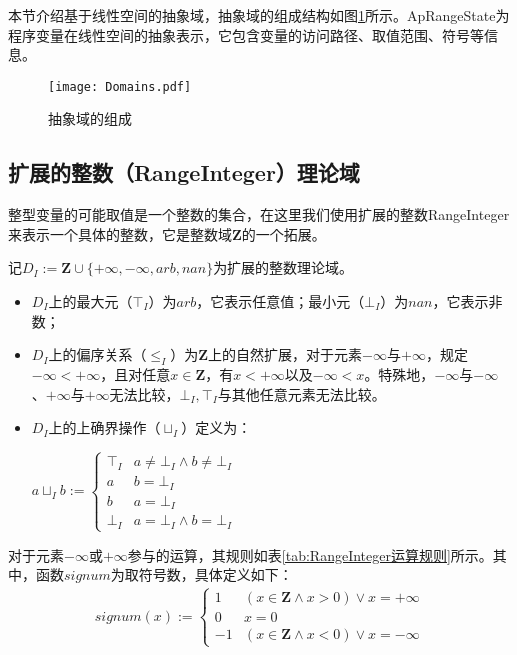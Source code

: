 本节介绍基于线性空间的抽象域，抽象域的组成结构如图\ref{fig:Domains}所示。ApRangeState为程序变量在线性空间的抽象表示，它包含变量的访问路径、取值范围、符号等信息。

\begin{figure}[H]
	\centering
	\texttt{[image: Domains.pdf]}
	\caption{抽象域的组成}
	\label{fig:Domains}
\end{figure}

\subsection{扩展的整数（RangeInteger）理论域}

整型变量的可能取值是一个整数的集合，在这里我们使用扩展的整数RangeInteger来表示一个具体的整数，它是整数域$ \mathbf{Z} $的一个拓展。

\begin{definition}
	记$ D_I := \mathbf{Z} \cup \{ +\infty, -\infty, arb, nan\}  $为扩展的整数理论域。
	\begin{itemize}
		\item $ D_I $上的最大元（$ \top_I $）为$ arb $，它表示任意值；最小元（$ \bot_I $）为$ nan $，它表示非数；
		
		\item $ D_I $上的偏序关系（$ \le_I $）为$ \mathbf{Z} $上的自然扩展，对于元素$ -\infty $与$ +\infty $，规定$ -\infty < +\infty $，且对任意$ x \in \mathbf{Z} $，有$ x < +\infty $以及$ -\infty < x $。特殊地，$ -\infty $与$ -\infty $、$ +\infty $与$ +\infty $无法比较，$ \bot_I, \top_I $与其他任意元素无法比较。
		
		\item $ D_I $上的上确界操作（$ \sqcup_I $）定义为：\\
		\centerline{$ a \sqcup_I b := \begin{cases}
			\top_I & a \ne \bot_I \land b \ne \bot_I\\
			a & b = \bot_I\\
			b & a = \bot_I\\
			\bot_I & a = \bot_I \land b = \bot_I
			\end{cases} $}
	\end{itemize}
\end{definition}

对于元素$ -\infty $或$ +\infty $参与的运算，其规则如表\ref{tab:RangeInteger运算规则}所示。其中，函数$ signum $为取符号数，具体定义如下：
\begin{align}
	signum(x) := \begin{cases}
		1 & (x \in \mathbf{Z} \land x > 0) \lor x = +\infty\\
		0 & x = 0\\
		-1 & (x \in \mathbf{Z} \land x < 0) \lor x = -\infty
	\end{cases}
\end{align}

